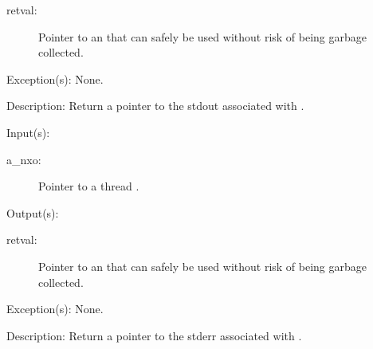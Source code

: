 \begin{capi}
\begin{capilist}
\begin{description}
		\item[retval: ]
			Pointer to an  that can safely be used
			without risk of being garbage collected.
		\end{description}
	\item[Exception(s): ] None.
	\item[Description: ]
		Return a pointer to the stdout associated with .
	\end{capilist}
\label{nxo_thread_stderr_get}
	\begin{capilist}
	\item[Input(s): ]
		\begin{description}\item[]
		\item[a\_nxo: ]
			Pointer to a thread .
		\end{description}
	\item[Output(s): ]
		\begin{description}\item[]
		\item[retval: ]
			Pointer to an  that can safely be used
			without risk of being garbage collected.
		\end{description}
	\item[Exception(s): ] None.
	\item[Description: ]
		Return a pointer to the stderr associated with .
	\end{capilist}
\end{capi}
